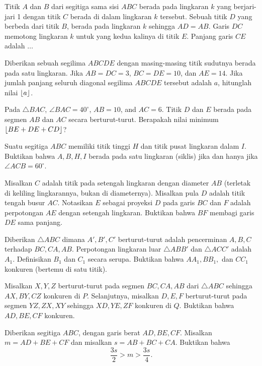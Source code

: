 \documentclass[11pt]{scrartcl}
\begin{document}
	\begin{soalbaru}
		Titik $A$ dan $B$ dari segitiga sama sisi $ABC$ berada pada lingkaran $k$ yang berjari-jari 1 dengan titik $C$ berada di dalam lingkaran $k$ tersebut. Sebuah titik $D$ yang berbeda dari titik $B$, berada pada lingkaran $k$ sehingga $AD=AB$. Garis $DC$ memotong lingkaran $k$ untuk yang kedua kalinya di titik $E$. Panjang garis $CE$ adalah $\dots$ %
	\end{soalbaru}

	\begin{soalbaru}
		Diberikan sebuah segilima $ABCDE$ dengan masing-masing titik sudutnya berada pada satu lingkaran. Jika $AB=DC=3$, $BC=DE=10$, dan $AE=14$. Jika jumlah panjang seluruh diagonal segilima $ABCDE$ tersebut adalah $a$, hitunglah nilai $\left\lfloor a \right\rfloor$.
	\end{soalbaru}
	
	\begin{soalbaru}
		Pada $\triangle BAC$, $\angle BAC = 40^\circ$, $AB=10$, and $AC=6$. Titik $D$ dan $E$ berada pada segmen $AB$ dan $AC$ secara berturut-turut. Berapakah nilai minimum $\left\lfloor BE+DE+CD \right\rfloor$?
	\end{soalbaru}
	
	\begin{soalbaru} 
		Suatu segitiga $ABC$ memiliki titik tinggi $H$ dan titik pusat lingkaran dalam $I$. Buktikan bahwa $A,B,H,I$ berada pada satu lingkaran (siklis) jika dan hanya jika $\angle ACB = 60^\circ$.
	\end{soalbaru}
	
	\begin{soalbaru} 
		 Misalkan $C$ adalah titik pada setengah lingkaran dengan diameter $AB$ (terletak di keliling lingkarannya, bukan di diameternya). Misalkan pula $D$ adalah titik tengah busur $AC$. Notasikan $E$ sebagai proyeksi $D$ pada garis $BC$ dan $F$ adalah perpotongan $AE$ dengan setengah lingkaran. Buktikan bahwa $BF$ membagi garis $DE$ sama panjang.
	\end{soalbaru}
	
	\begin{soalbaru} 
		Diberikan $\triangle ABC$ dimana $A',B',C'$ berturut-turut adalah pencerminan $A,B,C$ terhadap $BC,CA,AB$. Perpotongan lingkaran luar $\triangle ABB'$ dan $\triangle ACC'$ adalah $A_1$. Definisikan $B_1$ dan $C_1$ secara serupa. Buktikan bahwa $AA_1,BB_1,$ dan $CC_1$ konkuren (bertemu di satu titik).
	\end{soalbaru}
	
	\begin{soalbaru}
		Misalkan $X,Y,Z$ berturut-turut pada segmen $BC,CA,AB$ dari $\triangle ABC$ sehingga $AX, BY, CZ$ konkuren di $P$. Selanjutnya, misalkan $D,E,F$ berturut-turut pada segmen $YZ,ZX,XY$ sehingga $XD,YE,ZF$ konkuren di $Q$. Buktikan bahwa $AD,BE,CF$ konkuren.
	\end{soalbaru}
	
	\begin{soalbaru}
		Diberikan segitiga $ABC$, dengan garis berat $AD, BE, CF$. Misalkan $m=AD+BE+CF$ dan misalkan $s=AB+BC+CA$. Buktikan bahwa $$\dfrac{3s}{2} > m > \dfrac{3s}{4}.$$
	\end{soalbaru}
	
\end{document}
